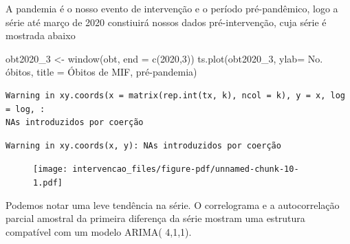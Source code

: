 \documentclass[
  letterpaper,
  DIV=11,
  numbers=noendperiod]{scrartcl}
\newenvironment{Shaded}{\begin{snugshade}}{\end{snugshade}}
\newcommand{\AttributeTok}[1]{\textcolor[rgb]{0.40,0.45,0.13}{#1}}
\newcommand{\DecValTok}[1]{\textcolor[rgb]{0.68,0.00,0.00}{#1}}
\newcommand{\FunctionTok}[1]{\textcolor[rgb]{0.28,0.35,0.67}{#1}}
\newcommand{\NormalTok}[1]{\textcolor[rgb]{0.00,0.23,0.31}{#1}}
\newcommand{\OtherTok}[1]{\textcolor[rgb]{0.00,0.23,0.31}{#1}}
\newcommand{\SpecialCharTok}[1]{\textcolor[rgb]{0.37,0.37,0.37}{#1}}
\newcommand{\StringTok}[1]{\textcolor[rgb]{0.13,0.47,0.30}{#1}}
\theoremstyle{plain}
\theoremstyle{plain}
\theoremstyle{definition}
\theoremstyle{definition}
\theoremstyle{remark}
\begin{document}
A pandemia é o nosso evento de intervenção e o período pré-pandêmico,
logo a série até março de 2020 constiuirá nossos dados pré-intervenção,
cuja série é mostrada abaixo

\begin{Shaded}
\begin{Highlighting}[]
\NormalTok{obt2020\_3 }\OtherTok{\textless{}{-}} \FunctionTok{window}\NormalTok{(obt, }\AttributeTok{end =} \FunctionTok{c}\NormalTok{(}\DecValTok{2020}\NormalTok{,}\DecValTok{3}\NormalTok{))}
\FunctionTok{ts.plot}\NormalTok{(obt2020\_3, }\AttributeTok{ylab=} \StringTok{\textquotesingle{}No. óbitos\textquotesingle{}}\NormalTok{, }\AttributeTok{title =} \StringTok{\textquotesingle{}Óbitos de MIF, pré{-}pandemia\textquotesingle{}}\NormalTok{)}
\end{Highlighting}
\end{Shaded}

\begin{verbatim}
Warning in xy.coords(x = matrix(rep.int(tx, k), ncol = k), y = x, log = log, :
NAs introduzidos por coerção
\end{verbatim}

\begin{verbatim}
Warning in xy.coords(x, y): NAs introduzidos por coerção
\end{verbatim}

\begin{figure}[H]

{\centering \texttt{[image: intervencao\_files/figure-pdf/unnamed-chunk-10-1.pdf]}

}

\end{figure}

Podemos notar uma leve tendência na série. O correlograma e a
autocorrelação parcial amostral da primeira diferença da série mostram
uma estrutura compatível com um modelo ARIMA( 4,1,1).

\begin{Shaded}
\end{Shaded}
\end{document}
